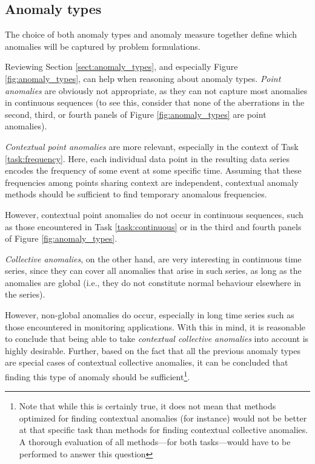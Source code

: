 \subsection{Anomaly types}

The choice of both anomaly types and anomaly measure together define which anomalies will be captured by problem formulations.

Reviewing Section \ref{sect:anomaly_types}, and especially Figure \ref{fig:anomaly_types}, can help when reasoning about anomaly types. \emph{Point anomalies} are obviously not appropriate, as they can not capture most anomalies in continuous sequences (to see this, consider that none of the aberrations in the second, third, or fourth panels of Figure \ref{fig:anomaly_types} are point anomalies).

\emph{Contextual point anomalies} are more relevant, especially in the context of Task \ref{task:frequency}. Here, each individual data point in the resulting data series encodes the frequency of some event at some specific time. Assuming that these frequencies among points sharing context are independent, contextual anomaly methods should be sufficient to find temporary anomalous frequencies.

However, contextual point anomalies do not occur in continuous sequences, such as those encountered in Task \ref{task:continuous} or in the third and fourth panels of Figure \ref{fig:anomaly_types}.

\emph{Collective anomalies}, on the other hand, are very interesting in continuous time series, since they can cover all anomalies that arise in such series, as long as the anomalies are global (i.e., they do not constitute normal behaviour elsewhere in the series).

However, non-global anomalies do occur, especially in long time series such as those encountered in monitoring applications. With this in mind, it is reasonable to conclude that being able to take \emph{contextual collective anomalies} into account is highly desirable. Further, based on the fact that all the previous anomaly types are special cases of contextual collective anomalies, it can be concluded that finding this type of anomaly should be sufficient\footnote{Note that while this is certainly true, it does not mean that methods optimized for finding contextual anomalies (for instance) would not be better at that specific task than methods for finding contextual collective anomalies. A thorough evaluation of all methods---for both tasks---would have to be performed to answer this question}.

